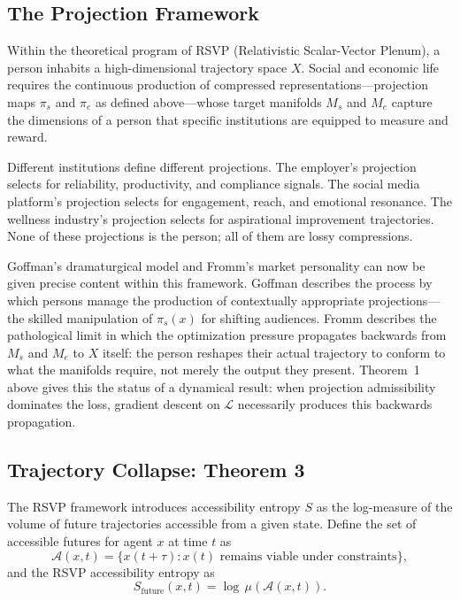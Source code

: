 \documentclass[12pt, a4paper]{article}
\theoremstyle{plain}
\theoremstyle{definition}
\theoremstyle{remark}
\begin{document}

\subsection{The Projection Framework}

Within the theoretical program of RSVP (Relativistic Scalar-Vector Plenum),
a person inhabits a high-dimensional trajectory space $X$.
Social and economic life requires the continuous production of compressed
representations---projection maps $\pi_s$ and $\pi_e$ as defined above---whose
target manifolds $M_s$ and $M_e$ capture the dimensions of a person that
specific institutions are equipped to measure and reward.

Different institutions define different projections.
The employer's projection selects for reliability, productivity, and compliance signals.
The social media platform's projection selects for engagement, reach, and emotional resonance.
The wellness industry's projection selects for aspirational improvement trajectories.
None of these projections is the person; all of them are lossy compressions.

Goffman's dramaturgical model and Fromm's market personality can now be given
precise content within this framework.
Goffman describes the process by which persons manage the production of contextually
appropriate projections---the skilled manipulation of $\pi_s(x)$ for shifting audiences.
Fromm describes the pathological limit in which the optimization pressure propagates
backwards from $M_s$ and $M_e$ to $X$ itself: the person reshapes their actual
trajectory to conform to what the manifolds require, not merely the output they present.
Theorem~1 above gives this the status of a dynamical result: when projection
admissibility dominates the loss, gradient descent on $\mathcal{L}$ necessarily
produces this backwards propagation.

\subsection{Trajectory Collapse: Theorem 3}

The RSVP framework introduces accessibility entropy $S$ as the log-measure of
the volume of future trajectories accessible from a given state.
Define the set of accessible futures for agent $x$ at time $t$ as
\[
\mathcal{A}(x,t)
= \{x(t+\tau) : x(t) \text{ remains viable under constraints}\},
\]
and the RSVP accessibility entropy as
\[
S_{\mathrm{future}}(x,t) = \log\,\mu(\mathcal{A}(x,t)).
\]
\end{document}
